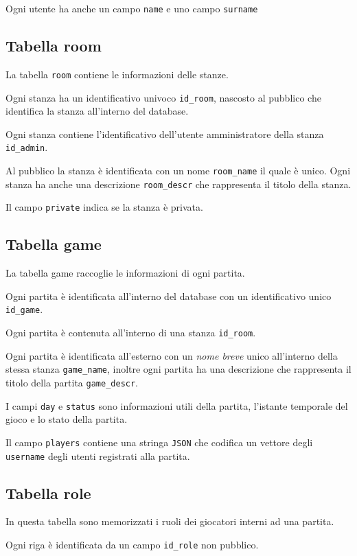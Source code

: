 \documentclass[10pt,a4paper]{article}
\begin{document}
Ogni utente ha anche un campo \texttt{name} e uno campo \texttt{surname}

\subsection{Tabella room}
La tabella \texttt{room} contiene le informazioni delle stanze. 

Ogni stanza ha un identificativo univoco \texttt{id\_room}, nascosto al pubblico che identifica la stanza all'interno del database. 

Ogni stanza contiene l'identificativo dell'utente amministratore della stanza \texttt{id\_admin}. 

Al pubblico la stanza è identificata con un nome \texttt{room\_name} il quale è unico. Ogni stanza ha anche una descrizione \texttt{room\_descr} che rappresenta il titolo della stanza. 

Il campo \texttt{private} indica se la stanza è privata.

\subsection{Tabella game}
La tabella game raccoglie le informazioni di ogni partita. 

Ogni partita è identificata all'interno del database con un identificativo unico \texttt{id\_game}. 

Ogni partita è contenuta all'interno di una stanza \texttt{id\_room}. 

Ogni partita è identificata all'esterno con un \emph{nome breve} unico all'interno della stessa stanza \texttt{game\_name}, inoltre ogni partita ha una descrizione che rappresenta il titolo della partita \texttt{game\_descr}.

I campi \texttt{day} e \texttt{status} sono informazioni utili della partita, l'istante temporale del gioco e lo stato della partita.

Il campo \texttt{players} contiene una stringa \texttt{JSON} che codifica un vettore degli \texttt{username} degli utenti registrati alla partita.

\subsection{Tabella role}
In questa tabella sono memorizzati i ruoli dei giocatori interni ad una partita. 

Ogni riga è identificata da un campo \texttt{id\_role} non pubblico. 
\end{document}
